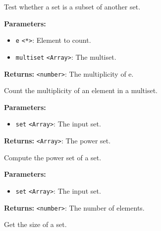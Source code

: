 \documentclass[12pt,a4paper]{article}
\begin{document}
\noindent Test whether a set is a subset of another set.

\vspace{5mm}
\noindent {}


\noindent \textbf{Parameters:}
\begin{itemize}
  \item \texttt{e} \texttt{<*>}: Element to count.
  \item \texttt{multiset} \texttt{<Array>}: The multiset.
\end{itemize}

\noindent \textbf{Returns:} \texttt{<number>}: The multiplicity of e.

\noindent Count the multiplicity of an element in a multiset.

\vspace{5mm}
\noindent {}


\noindent \textbf{Parameters:}
\begin{itemize}
  \item \texttt{set} \texttt{<Array>}: The input set.
\end{itemize}

\noindent \textbf{Returns:} \texttt{<Array>}: The power set.

\noindent Compute the power set of a set.

\vspace{5mm}
\noindent {}


\noindent \textbf{Parameters:}
\begin{itemize}
  \item \texttt{set} \texttt{<Array>}: The input set.
\end{itemize}

\noindent \textbf{Returns:} \texttt{<number>}: The number of elements.

\noindent Get the size of a set.

\vspace{5mm}
\noindent {}
\end{document}
